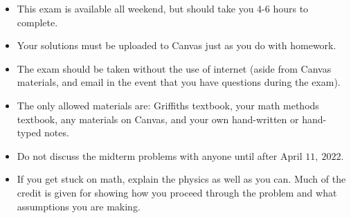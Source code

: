 \documentclass[fleqn]{article}
\begin{document}
  
  \begin{itemize}
    \item This exam is available all weekend, but should take you 4-6 hours to complete.
    \item Your solutions must be uploaded to Canvas just as you do with homework.
    \item The exam should be taken without the use of internet (aside from Canvas materials, and email
    in the event that you have questions during the exam).
    \item The only allowed materials are: Griffiths textbook, your math methods textbook, any materials
    on Canvas, and your own hand-written or hand-typed notes.
    \item Do not discuss the midterm problems with anyone until after April $11, ~ 2022$.
    \item If you get stuck on math, explain the physics as well as you can.  Much of the credit is given 
    for showing how you proceed through the problem and what assumptions you are making.
  \end{itemize}

  \pagebreak
\end{document}
